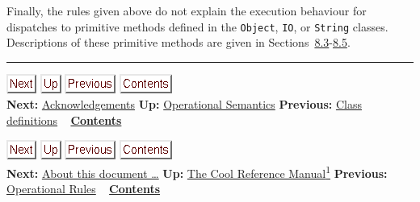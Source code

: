 \documentclass[]{article}
\begin{document}
Finally, the rules given above do not explain the execution behaviour
for dispatches to primitive methods defined in the \texttt{Object},
\texttt{IO}, or \texttt{String} classes. Descriptions of these primitive
methods are given in
Sections~\href{node29.html\#sec-int}{8.3}-\href{node31.html\#sec-bool}{8.5}.

\begin{center}\rule{3in}{0.4pt}\end{center}

\href{node49.html}{\includegraphics{next.png}}
\href{node44.html}{\includegraphics{up.png}}
\href{node47.html}{\includegraphics{prev.png}}
\href{node1.html}{\includegraphics{contents.png}} \\ \textbf{Next:}
\href{node49.html}{Acknowledgements} \textbf{Up:}
\href{node44.html}{Operational Semantics} \textbf{Previous:}
\href{node47.html}{Class definitions} ~
\textbf{\href{node1.html}{Contents}}

\href{node50.html}{\includegraphics{next.png}}
\href{cool-manual.html}{\includegraphics{up.png}}
\href{node48.html}{\includegraphics{prev.png}}
\href{node1.html}{\includegraphics{contents.png}} \\ \textbf{Next:}
\href{node50.html}{About this document \ldots{}} \textbf{Up:}
\href{cool-manual.html}{The Cool Reference Manual\textsuperscript{1}}
\textbf{Previous:} \href{node48.html}{Operational Rules} ~
\textbf{\href{node1.html}{Contents}} \\ \\
\end{document}
